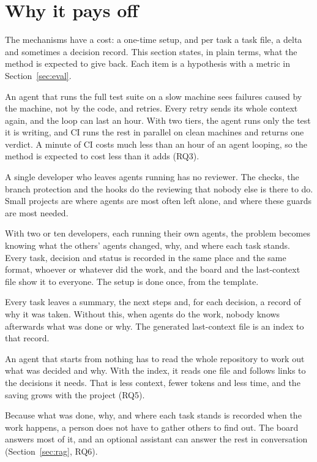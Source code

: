 \documentclass[11pt,a4paper]{article}
\begin{document}
\section{Why it pays off}
\label{sec:value}

The mechanisms have a cost: a one-time setup, and per task a task file, a delta and sometimes a decision record. This section states, in plain terms, what the method is expected to give back. Each item is a hypothesis with a metric in Section~\ref{sec:eval}.

\begin{description}[leftmargin=0pt, labelindent=0pt, itemsep=4pt]
  \item[It is cheaper to run.] An agent that runs the full test suite on a slow machine sees failures caused by the machine, not by the code, and retries. Every retry sends its whole context again, and the loop can last an hour. With two tiers, the agent runs only the test it is writing, and CI runs the rest in parallel on clean machines and returns one verdict. A minute of CI costs much less than an hour of an agent looping, so the method is expected to cost less than it adds (RQ3).
  \item[It works for one person.] A single developer who leaves agents running has no reviewer. The checks, the branch protection and the hooks do the reviewing that nobody else is there to do. Small projects are where agents are most often left alone, and where these guards are most needed.
  \item[It makes agents' work visible to a team.] With two or ten developers, each running their own agents, the problem becomes knowing what the others' agents changed, why, and where each task stands. Every task, decision and status is recorded in the same place and the same format, whoever or whatever did the work, and the board and the last-context file show it to everyone. The setup is done once, from the template.
  \item[It documents the project as it goes.] Every task leaves a summary, the next steps and, for each decision, a record of why it was taken. Without this, when agents do the work, nobody knows afterwards what was done or why. The generated last-context file is an index to that record.
  \item[A new agent understands the project faster.] An agent that starts from nothing has to read the whole repository to work out what was decided and why. With the index, it reads one file and follows links to the decisions it needs. That is less context, fewer tokens and less time, and the saving grows with the project (RQ5).
  \item[Fewer status meetings.] Because what was done, why, and where each task stands is recorded when the work happens, a person does not have to gather others to find out. The board answers most of it, and an optional assistant can answer the rest in conversation (Section~\ref{sec:rag}, RQ6).
\end{description}
\end{document}
